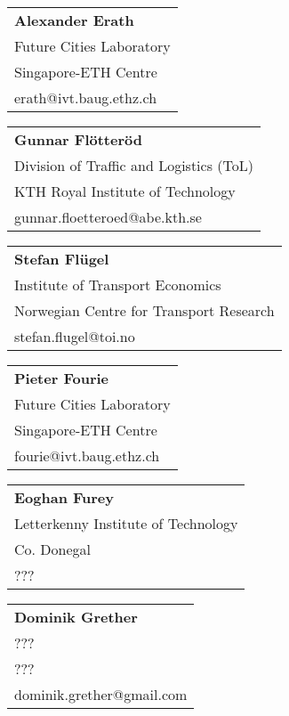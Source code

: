 \begin{tabular}[width=0.48\textwidth]{l}
\textbf{Alexander Erath} \\
Future Cities Laboratory \\
Singapore-ETH Centre\\
erath@ivt.baug.ethz.ch \\
\end{tabular}

\begin{tabular}[width=0.48\textwidth]{l}
\textbf{Gunnar Flötteröd} \\
Division of Traffic and Logistics (ToL) \\
KTH Royal Institute of Technology \\
gunnar.floetteroed@abe.kth.se \\
\end{tabular}

\begin{tabular}[width=0.48\textwidth]{l}
\textbf{Stefan Flügel} \\
Institute of Transport Economics \\
Norwegian Centre for Transport Research \\
stefan.flugel@toi.no \\
\end{tabular}

\begin{tabular}[width=0.48\textwidth]{l}
\textbf{Pieter Fourie} \\
Future Cities Laboratory \\
Singapore-ETH Centre\\
fourie@ivt.baug.ethz.ch \\
\end{tabular}

\begin{tabular}[width=0.48\textwidth]{l}
\textbf{Eoghan Furey} \\
Letterkenny Institute of Technology \\
Co. Donegal \\
??? \\
\end{tabular}

\begin{tabular}[width=0.48\textwidth]{l}
\textbf{Dominik Grether} \\
??? \\
??? \\
dominik.grether@gmail.com \\
\end{tabular}

